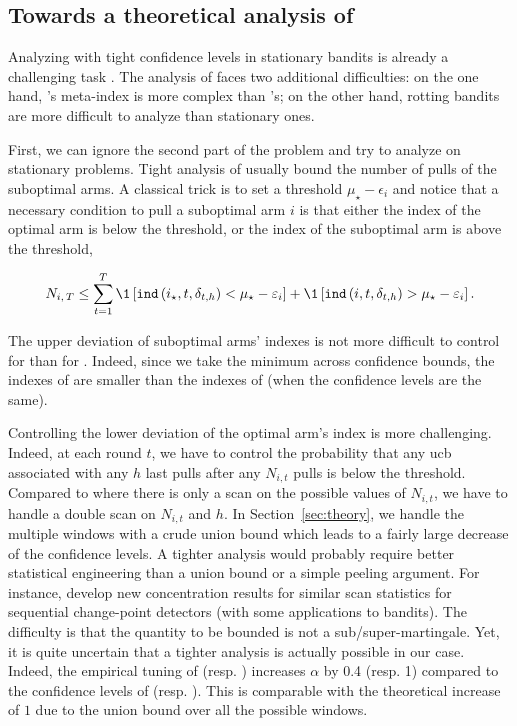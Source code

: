 \subsection{Towards a theoretical analysis of {\RAWUCBpp}}
Analyzing \UCB with tight confidence levels in stationary bandits is already a challenging task \citep{degenne2016anytime, menard2017klucb++, lattimore2018refining}. The analysis of \RAWUCBpp faces two additional difficulties: on the one hand, \RAWUCB 's meta-index is more complex than \UCB 's; on the other hand, rotting bandits are more difficult to analyze than stationary ones. 

First, we can ignore the second part of the problem and try to analyze \RAWUCBpp on stationary problems. Tight analysis of \UCB usually bound the number of pulls of the suboptimal arms. A classical trick is to set a threshold $\mu_\star - \epsilon_i$ and notice that a necessary condition to pull a suboptimal arm $i$ is that either the index of the optimal arm is below the threshold, or the index of the suboptimal arm is above the threshold,

\[ \NiT \leq \sum_{t=1}^T \1 \left[ \texttt{ind}\pa{i_\star, t, \delta_{t,h}} < \mu_\star - \epsilon_i \right] + \1 \left[ \texttt{ind}\pa{i, t, \delta_{t,h}} > \mu_\star - \epsilon_i \right].
\]

The upper deviation of suboptimal arms' indexes is not more difficult to control for \RAWUCB than for \UCB. Indeed, since we take the minimum across confidence bounds, the indexes of \RAWUCB are smaller than the indexes of \UCB (when the confidence levels are the same). 

Controlling the lower deviation of the optimal arm's index is more challenging.  Indeed, at each round $t$, we have to control the probability that any ucb associated with any $h$ last pulls after any $N_{i,t}$ pulls is below the threshold. Compared to \UCB where there is only a scan on the possible values of $N_{i,t}$, we have to handle a double scan on $N_{i,t}$ and $h$. In Section~\ref{sec:theory}, we handle the multiple windows with a crude union bound which leads to a fairly large decrease of the confidence levels. A tighter analysis would probably require better statistical engineering than a union bound or a simple peeling argument. For instance, \citet{maillard2019sequential} develop new concentration results for similar scan statistics for sequential change-point detectors (with some applications to bandits). The difficulty is that the quantity to be bounded is not a sub/super-martingale. Yet, it is quite uncertain that a tighter analysis is actually possible in our case. Indeed, the empirical tuning of \RAWUCB (resp. \RAWUCBpp) increases $\alpha$ by 0.4 (resp. 1) compared to the confidence levels of \UCB (resp. \MOSSa). This is comparable with the theoretical increase of $1$ due to the union bound over all the possible windows.